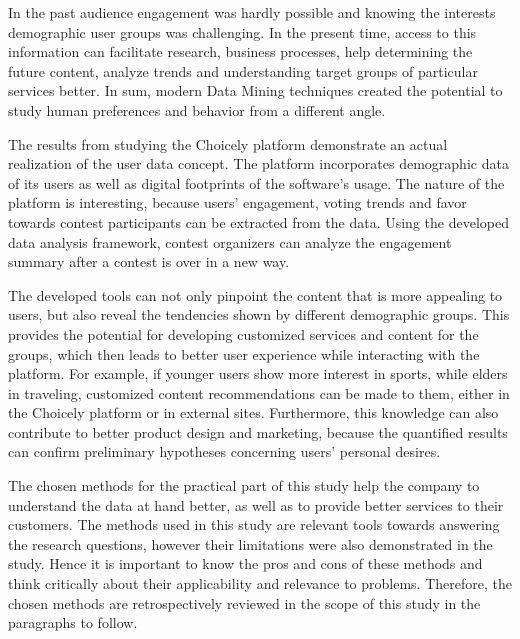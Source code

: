 In the past audience engagement was hardly possible and knowing the interests demographic user groups was challenging. In the present time, access to this information can facilitate research, business processes, help determining the future content, analyze trends and understanding target groups of particular services better. In sum, modern Data Mining techniques created the potential to study human preferences and behavior from a different angle.

The results from studying the Choicely platform demonstrate an actual realization of the user data concept. The platform incorporates demographic data of its users as well as digital footprints of the software's usage. The nature of the platform is interesting, because users' engagement, voting trends and favor towards contest participants can be extracted from the data. Using the developed data analysis framework, contest organizers can analyze the engagement summary after a contest is over in a new way. 

The developed tools can not only pinpoint the content that is more appealing to users, but also reveal the tendencies shown by different demographic groups. This provides the potential for developing customized services and content for the groups, which then leads to better user experience while interacting with the platform. For example, if younger users show more interest in sports, while elders in traveling, customized content recommendations can be made to them, either in the Choicely platform or in external sites. Furthermore, this knowledge can also contribute to better product design and marketing, because the quantified results can confirm preliminary hypotheses concerning users' personal desires. 

The chosen methods for the practical part of this study help the company to understand the data at hand better, as well as to provide better services to their customers. The methods used in this study are relevant tools towards answering the research questions, however their limitations were also demonstrated in the study. Hence it is important to know the pros and cons of these methods and think critically about their applicability and relevance to problems. Therefore, the chosen methods are retrospectively reviewed in the scope of this study in the paragraphs to follow.

